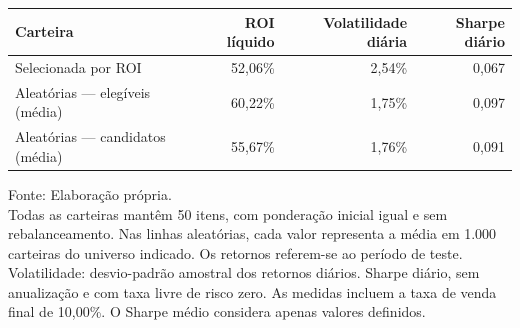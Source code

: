 \begingroup
\setlength{}
\setlength{}
\fontsize{11.0pt}{13.2pt}\selectfont

\setlength{\LTpost}{0mm}
\begin{longtable}{@{\extracolsep{\fill}}lrrr}

\toprule
\textbf{Carteira} & \textbf{ROI líquido} & \textbf{Volatilidade diária} & \textbf{Sharpe diário} \\ 
\midrule\addlinespace[2.5pt]
Selecionada por ROI & 52,06\% & 2,54\% & 0,067 \\
Aleatórias — elegíveis (média) & 60,22\% & 1,75\% & 0,097 \\
Aleatórias — candidatos (média) & 55,67\% & 1,76\% & 0,091 \\
\bottomrule
\end{longtable}
\begin{minipage}{\linewidth}
Fonte: Elaboração própria.\\
Todas as carteiras mantêm 50 itens, com ponderação inicial igual e sem rebalanceamento. Nas linhas aleatórias, cada valor representa a média em 1.000 carteiras do universo indicado. Os retornos referem-se ao período de teste. Volatilidade: desvio-padrão amostral dos retornos diários. Sharpe diário, sem anualização e com taxa livre de risco zero. As medidas incluem a taxa de venda final de 10,00\%. O Sharpe médio considera apenas valores definidos.\\
\end{minipage}
\endgroup
